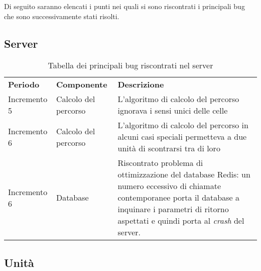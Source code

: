 Di seguito saranno elencati i punti nei quali si sono riscontrati i principali bug che sono successivamente stati risolti.

\subsection{Server}

\begin{table} [!ht]
	\begin{center}
		\begin{tabular} { m{2.5cm} m{2.5cm} m{11cm}  }
			\rowcolor{lightgray}
			\textbf{Periodo} & \textbf{Componente} & \textbf{Descrizione}\\
			
			Incremento 5 & Calcolo del percorso & L'algoritmo di calcolo del percorso ignorava i sensi unici delle celle \\
			Incremento 6 & Calcolo del percorso & L'algoritmo di calcolo del percorso in alcuni casi speciali permetteva a due unità di scontrarsi tra di loro \\
			Incremento 6 & Database & Riscontrato problema di ottimizzazione del database Redis: un numero eccessivo
			di chiamate contemporanee porta il database a inquinare i parametri di ritorno aspettati e quindi porta 
			al \textit{crash} del server. \\
			
								
		\end{tabular}
	\end{center}
	\caption{Tabella dei principali bug riscontrati nel server}
\end{table}

\subsection{Unità}

